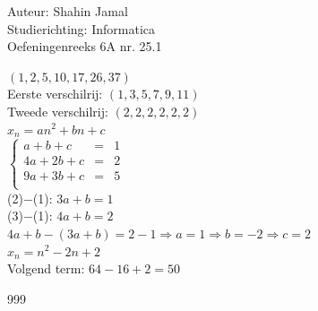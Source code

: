 \documentclass[a4paper]{article}
\begin{document}
  
\noindent \large Auteur: Shahin Jamal \\
\noindent \large Studierichting: Informatica\\
\noindent \large Oefeningenreeks 6A nr. 25.1\\

\medskip

\normalsize

$\left(1, 2, 5, 10, 17, 26, 37\right)$\\

Eerste verschilrij: $\left(1, 3, 5, 7, 9, 11\right)$\\

Tweede verschilrij: $\left(2, 2, 2, 2, 2, 2\right)$\\

$x_n=an^2+bn+c$\\

$\left\{
\begin{array}{lll}
a + b + c & = & 1 \\
4a + 2b + c & = & 2 \\
9a + 3b + c & = & 5 \\
\end{array}
\right.$\\

(2)$-$(1): $3a+b=1$\\

(3)$-$(1): $4a+b=2$\\

$4a+b -(3a+b) = 2-1 \Rightarrow a = 1 \Rightarrow b = -2 \Rightarrow c = 2$\\

$x_n = n^2-2n+2$\\

Volgend term: $64-16+2=50$\\

\begin{thebibliography}{999}
\end{thebibliography}
\end{document}
